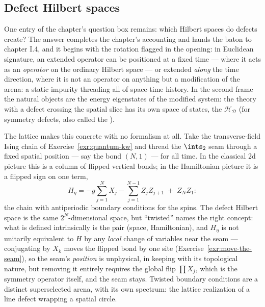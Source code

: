 \subsection{Defect Hilbert spaces}
\label{sec:defect-hilbert}

One entry of the chapter's question box remains: which Hilbert spaces
do defects create? The answer completes the chapter's accounting and
hands the baton to chapter I.4, and it begins with the rotation flagged
in the opening: in Euclidean signature, an extended operator can be
positioned at a fixed time --- where it acts as an \emph{operator} on
the ordinary Hilbert space --- or extended \emph{along} the time
direction, where it is not an operator on anything but a modification
of the arena: a static impurity threading all of space-time history.
In the second frame the natural objects are the energy eigenstates of
the modified system: the theory with a defect crossing the spatial
slice has its own space of states, the 
$\mathcal H_{\mathcal D}$ (for symmetry defects, also called the
).

The lattice makes this concrete with no formalism at all. Take the
transverse-field Ising chain of Exercise~\ref{exr:quantum-kw} and
thread the $\ints_2$ seam through a fixed spatial position --- say the
bond $(N, 1)$ --- for all time. In the classical 2d picture this is a
column of flipped vertical bonds; in the Hamiltonian picture it is a
flipped sign on one term,
\begin{equation}
H_\eta = -g\sum_{j=1}^{N} X_j - \sum_{j=1}^{N-1} Z_j Z_{j+1}
\;+\; Z_N Z_1 :
\label{eq:twisted-tfim}
\end{equation}
the chain with antiperiodic boundary conditions for the spins. The
defect Hilbert space is the same $2^N$-dimensional space, but
``twisted'' names the right concept: what is defined intrinsically is
the pair (space, Hamiltonian), and $H_\eta$ is not unitarily equivalent
to $H$ by any \emph{local} change of variables near the seam ---
conjugating by $X_k$ moves the flipped bond by one site
(Exercise~\ref{exr:move-the-seam}), so the seam's \emph{position} is
unphysical, in keeping with its topological nature, but removing it
entirely requires the global flip $\prod X_j$, which is the symmetry
operator itself, and the seam stays. Twisted boundary conditions are a
distinct superselected arena, with its own spectrum: the lattice
realization of a line defect wrapping a spatial circle.

